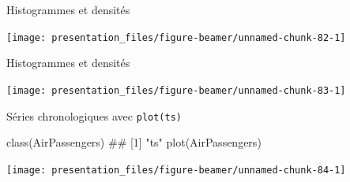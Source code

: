\documentclass[12pt,handout,ignorenonframetext,]{beamer}
\newenvironment{Shaded}{}{}
\newcommand{\KeywordTok}[1]{\textcolor[rgb]{0.00,0.00,1.00}{{#1}}}
\newcommand{\DataTypeTok}[1]{{#1}}
\newcommand{\DecValTok}[1]{{#1}}
\newcommand{\FloatTok}[1]{{#1}}
\newcommand{\StringTok}[1]{\textcolor[rgb]{0.00,0.50,0.50}{{#1}}}
\newcommand{\OtherTok}[1]{\textcolor[rgb]{1.00,0.25,0.00}{{#1}}}
\newcommand{\NormalTok}[1]{{#1}}
\renewenvironment{Shaded}{\begin{snugshade}}{\end{snugshade}}
\begin{document}
\begin{frame}[fragile]{Histogrammes et densités}

\centering \footnotesize

\begin{Shaded}
\end{Shaded}

\texttt{[image: presentation\_files/figure-beamer/unnamed-chunk-82-1]}

\end{frame}

\begin{frame}[fragile]{Histogrammes et densités}

\centering \footnotesize

\begin{Shaded}
\end{Shaded}

\texttt{[image: presentation\_files/figure-beamer/unnamed-chunk-83-1]}

\end{frame}

\begin{frame}[fragile]{Séries chronologiques avec \texttt{plot(ts)}}

\centering \footnotesize

\begin{Shaded}
\begin{Highlighting}[]
\KeywordTok{class}\NormalTok{(AirPassengers)}
  \NormalTok{## [1] "ts"}
\KeywordTok{plot}\NormalTok{(AirPassengers)}
\end{Highlighting}
\end{Shaded}

\texttt{[image: presentation\_files/figure-beamer/unnamed-chunk-84-1]}

\end{frame}
\end{document}
